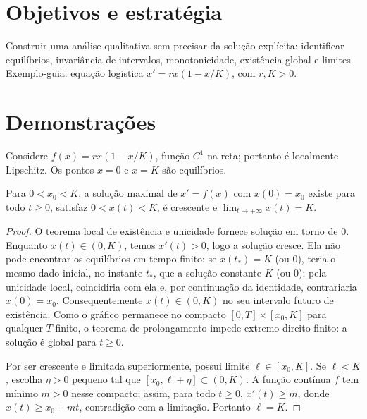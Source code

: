 \documentclass[11pt,a4paper]{article}
\begin{document}
\section{Objetivos e estratégia}
Construir uma análise qualitativa sem precisar da solução explícita: identificar equilíbrios, invariância de intervalos, monotonicidade, existência global e limites. Exemplo-guia: equação logística $x'=rx(1-x/K)$, com $r,K>0$.
\section{Demonstrações}
Considere $f(x)=rx(1-x/K)$, função $C^1$ na reta; portanto é localmente Lipschitz. Os pontos $x=0$ e $x=K$ são equilíbrios.
\begin{proposicao}
Para $0<x_0<K$, a solução maximal de $x'=f(x)$ com $x(0)=x_0$ existe para todo $t\ge0$, satisfaz $0<x(t)<K$, é crescente e $\lim_{t\to+\infty}x(t)=K$.
\end{proposicao}
\begin{proof}
O teorema local de existência e unicidade fornece solução em torno de $0$. Enquanto $x(t)\in(0,K)$, temos $x'(t)>0$, logo a solução cresce. Ela não pode encontrar os equilíbrios em tempo finito: se $x(t_*)=K$ (ou $0$), teria o mesmo dado inicial, no instante $t_*$, que a solução constante $K$ (ou $0$); pela unicidade local, coincidiria com ela e, por continuação da identidade, contrariaria $x(0)=x_0$. Consequentemente $x(t)\in(0,K)$ no seu intervalo futuro de existência. Como o gráfico permanece no compacto $[0,T]\times[x_0,K]$ para qualquer $T$ finito, o teorema de prolongamento impede extremo direito finito: a solução é global para $t\ge0$.

Por ser crescente e limitada superiormente, possui limite $\ell\in[x_0,K]$. Se $\ell<K$, escolha $\eta>0$ pequeno tal que $[x_0,\ell+\eta]\subset(0,K)$. A função contínua $f$ tem mínimo $m>0$ nesse compacto; assim, para todo $t\ge0$, $x'(t)\ge m$, donde $x(t)\ge x_0+mt$, contradição com a limitação. Portanto $\ell=K$.
\end{proof}
\end{document}
